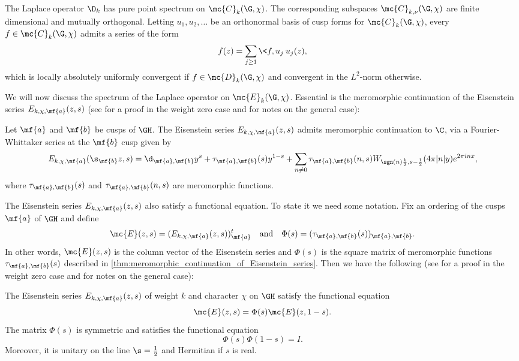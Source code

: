     \begin{theorem}\label{thm:cusp_form_spectrum}
      The Laplace operator $\D_{k}$ has pure point spectrum on $\mc{C}_{k}(\G,\chi)$. The corresponding subspaces $\mc{C}_{k,\nu}(\G,\chi)$ are finite dimensional and mutually orthogonal. Letting $u_{1},u_{2},\ldots$ be an orthonormal basis of cusp forms for $\mc{C}_{k}(\G,\chi)$, every $f \in \mc{C}_{k}(\G,\chi)$ admits a series of the form
      \[
        f(z) = \sum_{j \ge 1}\<f,u_{j}\>u_{j}(z),
      \]
      which is locally absolutely uniformly convergent if $f \in \mc{D}_{k}(\G,\chi)$ and convergent in the $L^{2}$-norm otherwise.
    \end{theorem}

    We will now discuss the spectrum of the Laplace operator on $\mc{E}_{k}(\G,\chi)$. Essential is the meromorphic continuation of the Eisenstein series $E_{k,\chi,\mf{a}}(z,s)$ (see \cite{iwaniec2002spectral} for a proof in the weight zero case and \cite{duke2002subconvexity} for notes on the general case):

    \begin{theorem}\label{thm:meromorphic_continuation_of_Eisenstein_series}
      Let $\mf{a}$ and $\mf{b}$ be cusps of $\GH$. The Eisenstein series $E_{k,\chi,\mf{a}}(z,s)$ admits meromorphic continuation to $\C$, via a Fourier-Whittaker series at the $\mf{b}$ cusp given by
      \[
        E_{k,\chi,\mf{a}}(\s_{\mf{b}}z,s) = \d_{\mf{a},\mf{b}}y^{s}+\tau_{\mf{a},\mf{b}}(s)y^{1-s}+\sum_{n \neq 0}\tau_{\mf{a},\mf{b}}(n,s)W_{\sgn(n)\frac{k}{2},s-\frac{1}{2}}(4\pi|n|y)e^{2\pi inx},
      \]
      where $\tau_{\mf{a},\mf{b}}(s)$ and $\tau_{\mf{a},\mf{b}}(n,s)$ are meromorphic functions.
    \end{theorem}

    The Eisenstein series $E_{k,\chi,\mf{a}}(z,s)$ also satisfy a functional equation. To state it we need some notation. Fix an ordering of the cusps $\mf{a}$ of $\GH$ and define
    \[
      \mc{E}(z,s) = (E_{k,\chi,\mf{a}}(z,s))_{\mf{a}}^{t} \quad \text{and} \quad \Phi(s) = (\tau_{\mf{a},\mf{b}}(s))_{\mf{a},\mf{b}}.
    \]
    In other words, $\mc{E}(z,s)$ is the column vector of the Eisenstein series and $\Phi(s)$ is the square matrix of meromorphic functions $\tau_{\mf{a},\mf{b}}(s)$ described in \cref{thm:meromorphic_continuation_of_Eisenstein_series}. Then we have the following (see \cite{iwaniec2002spectral} for a proof in the weight zero case and \cite{duke2002subconvexity} for notes on the general case): 

    \begin{theorem}\label{thm:functional_equation_of_Eisenstein_series}
      The Eisenstein series $E_{k,\chi,\mf{a}}(z,s)$ of weight $k$ and character $\chi$ on $\GH$ satisfy the functional equation 
      \[
        \mc{E}(z,s) = \Phi(s)\mc{E}(z,1-s).
      \]
      The matrix $\Phi(s)$ is symmetric and satisfies the functional equation
      \[
        \Phi(s)\Phi(1-s) = I.
      \]
      Moreover, it is unitary on the line $\s = \frac{1}{2}$ and Hermitian if $s$ is real.
    \end{theorem}

